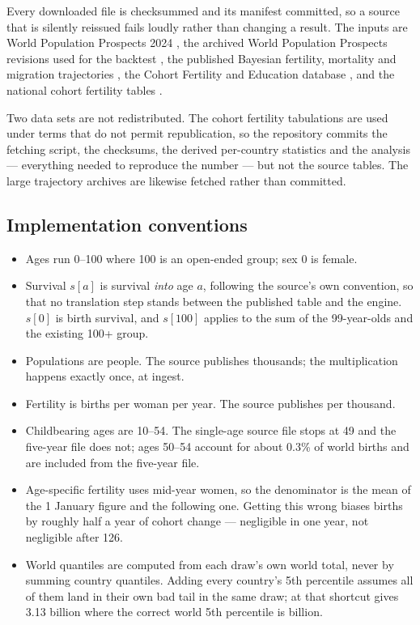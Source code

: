 Every downloaded file is checksummed and its manifest committed, so a source that
is silently reissued fails loudly rather than changing a result. The inputs are
World Population Prospects 2024 \citep{un2024methodology}, the archived World
Population Prospects revisions used for the backtest \citep{unwpparchives}, the
published Bayesian fertility, mortality and migration trajectories
\citep{uw2024downloads,azose2015}, the Cohort Fertility and Education database
\citep{cfe2017}, and the national cohort fertility tables \citep{cdccohort}.

Two data sets are not redistributed. The cohort fertility tabulations are used
under terms that do not permit republication, so the repository commits the
fetching script, the checksums, the derived per-country statistics and the
analysis --- everything needed to reproduce the number --- but not the source
tables. The large trajectory archives are likewise fetched rather than committed.

\subsection*{Implementation conventions}

\begin{itemize}[leftmargin=1.2em]
\item Ages run 0--100 where 100 is an open-ended group; sex 0 is female.
\item Survival $s[a]$ is survival \emph{into} age $a$, following the source's own
convention, so that no translation step stands between the published table and
the engine. $s[0]$ is birth survival, and $s[100]$ applies to the sum of the
99-year-olds and the existing 100+ group.
\item Populations are people. The source publishes thousands; the multiplication
happens exactly once, at ingest.
\item Fertility is births per woman per year. The source publishes per thousand.
\item Childbearing ages are 10--54. The single-age source file stops at 49 and
the five-year file does not; ages 50--54 account for about 0.3\% of world births
and are included from the five-year file.
\item Age-specific fertility uses mid-year women, so the denominator is the mean
of the 1 January figure and the following one. Getting this wrong biases births
by roughly half a year of cohort change --- negligible in one year, not
negligible after 126.
\item World quantiles are computed from each draw's own world total, never by
summing country quantiles. Adding every country's 5th percentile assumes all of
them land in their own bad tail in the same draw; at \ProjectionEndYear{} that
shortcut gives 3.13 billion where the correct world 5th percentile is
\ComparatorTwentyOneFiftyLow{} billion.
\end{itemize}

